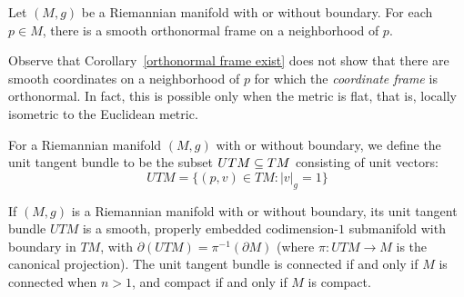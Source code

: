 \begin{corollary}\label{orthonormal frame exist}
Let $(M,g)$ be a Riemannian manifold with or without boundary. For each $p\in M$, there is a smooth orthonormal frame on a neighborhood of $p$.
\end{corollary}
Observe that Corollary~\ref{orthonormal frame exist} does not show that there are smooth coordinates on a neighborhood of $p$ for which the \textit{coordinate frame} is 
orthonormal. In fact, this is possible only when the metric is flat, that is, locally isometric to the Euclidean metric.\par
For a Riemannian manifold $(M,g)$ with or without boundary, we define the unit tangent bundle to be the subset $UTM\subseteq TM$ consisting of unit vectors:
\[UTM=\{(p,v)\in TM:|v|_g=1\}\]
\begin{proposition}
If $(M,g)$ is a Riemannian manifold with or without boundary, its unit tangent bundle $UTM$ is a smooth, properly embedded codimension-$1$ submanifold with 
boundary in $TM$, with $\partial(UTM)=\pi^{-1}(\partial M)$ (where $\pi:UTM\to M$ is the canonical projection). The unit tangent bundle is connected if and only if $M$ 
is connected when $n>1$, and compact if and only if $M$ is compact.
\end{proposition}
